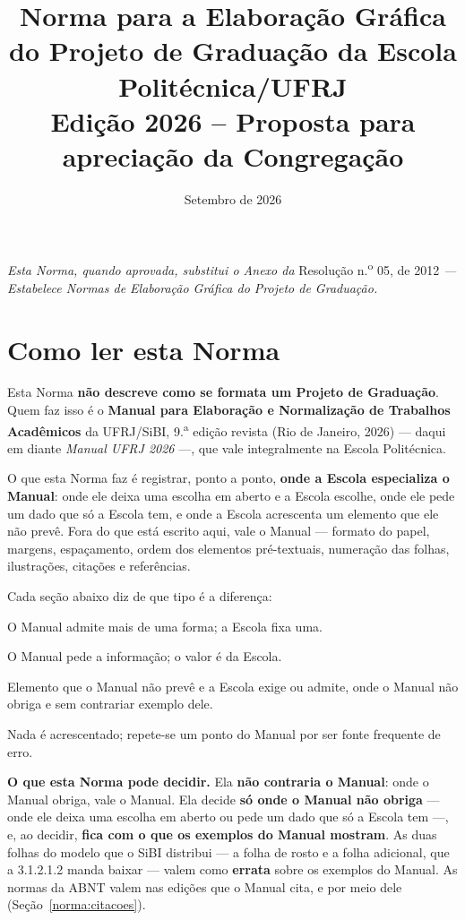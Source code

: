 \documentclass[a4paper,11pt]{article}
\title{\bfseries Norma para a Elaboração Gráfica do Projeto de Graduação
       da Escola Politécnica/UFRJ\\[2mm]
       \large Edição 2026 -- Proposta para apreciação da Congregação}
\author{}
\date{Setembro de 2026}
\begin{document}
\maketitle

\noindent\textit{Esta Norma, quando aprovada, substitui o Anexo da} Resolução
n.\textsuperscript{o} 05, de 2012 \textit{--- Estabelece Normas de Elaboração
Gráfica do Projeto de Graduação.}

\hrulefill

\section*{Como ler esta Norma}

Esta Norma \textbf{não descreve como se formata um Projeto de Graduação}. Quem
faz isso é o \textbf{Manual para Elaboração e Normalização de Trabalhos
Acadêmicos} da UFRJ/SiBI, 9.\textsuperscript{a} edição revista (Rio de Janeiro,
2026) --- daqui em diante \textit{Manual UFRJ 2026} ---, que vale integralmente
na Escola Politécnica.

O que esta Norma faz é registrar, ponto a ponto, \textbf{onde a Escola
especializa o Manual}: onde ele deixa uma escolha em aberto e a Escola escolhe,
onde ele pede um dado que só a Escola tem, e onde a Escola acrescenta um
elemento que ele não prevê. Fora do que está escrito aqui, vale o Manual ---
formato do papel, margens, espaçamento, ordem dos elementos pré-textuais,
numeração das folhas, ilustrações, citações e referências.

Cada seção abaixo diz de que tipo é a diferença:

\begin{description}[leftmargin=2.6cm,style=nextline,font=\bfseries]
  \item[Escolha] O Manual admite mais de uma forma; a Escola fixa uma.
  \item[Dado próprio] O Manual pede a informação; o valor é da Escola.
  \item[Acréscimo] Elemento que o Manual não prevê e a Escola exige ou admite,
    onde o Manual não obriga e sem contrariar exemplo dele.
  \item[Reafirmação] Nada é acrescentado; repete-se um ponto do Manual por ser
    fonte frequente de erro.
\end{description}

\textbf{O que esta Norma pode decidir.} Ela \textbf{não contraria o Manual}:
onde o Manual obriga, vale o Manual. Ela decide \textbf{só onde o Manual não
obriga} --- onde ele deixa uma escolha em aberto ou pede um dado que só a
Escola tem ---, e, ao decidir, \textbf{fica com o que os exemplos do Manual
mostram}. As duas folhas do modelo que o SiBI distribui --- a folha de rosto e
a folha adicional, que a 3.1.2.1.2 manda baixar --- valem como \textbf{errata}
sobre os exemplos do Manual. As normas da ABNT valem nas edições que o Manual
cita, e por meio dele (Seção~\ref{norma:citacoes}).
\end{document}
